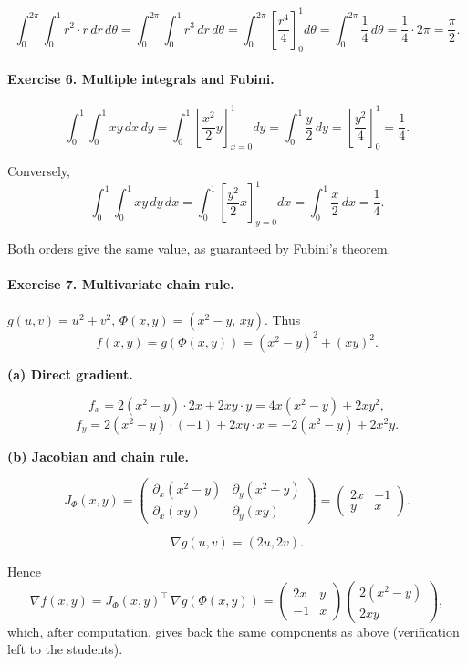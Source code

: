 \documentclass[11pt]{article}
\begin{document}
\[
\int_0^{2\pi}\int_0^1 r^2 \cdot r\,dr\,d\theta
= \int_0^{2\pi}\int_0^1 r^3\,dr\,d\theta
= \int_0^{2\pi}\left[\frac{r^4}{4}\right]_0^1 d\theta
= \int_0^{2\pi}\frac14\,d\theta
=\frac14\cdot 2\pi=\frac{\pi}{2}.
\]

\bigskip

\paragraph{Exercise 6. Multiple integrals and Fubini.}

\[
\int_0^1\int_0^1 xy\,dx\,dy
= \int_0^1\left[\frac{x^2}{2}y\right]_{x=0}^{1}dy
= \int_0^1 \frac{y}{2}\,dy
= \left[\frac{y^2}{4}\right]_0^1=\frac14.
\]

Conversely,
\[
\int_0^1\int_0^1 xy\,dy\,dx
= \int_0^1\left[\frac{y^2}{2}x\right]_{y=0}^{1}dx
= \int_0^1 \frac{x}{2}\,dx = \frac14.
\]

Both orders give the same value, as guaranteed by Fubini’s theorem.

\bigskip

\paragraph{Exercise 7. Multivariate chain rule.}

\(g(u,v)=u^2+v^2\), \(\Phi(x,y)=(x^2-y,\,xy)\).  
Thus
\[
f(x,y)=g(\Phi(x,y))=(x^2-y)^2+(xy)^2.
\]

\textbf{(a) Direct gradient.}

\[
f_x = 2(x^2-y)\cdot 2x + 2xy\cdot y = 4x(x^2-y)+2xy^2,
\]
\[
f_y = 2(x^2-y)\cdot(-1) + 2xy\cdot x = -2(x^2-y)+2x^2y.
\]

\textbf{(b) Jacobian and chain rule.}

\[
J_\Phi(x,y)=
\begin{pmatrix}
\partial_x(x^2-y) & \partial_y(x^2-y)\\[4pt]
\partial_x(xy) & \partial_y(xy)
\end{pmatrix}
=
\begin{pmatrix}
2x & -1\\[4pt]
y & x
\end{pmatrix}.
\]

\[
\nabla g(u,v)=(2u,2v).
\]

Hence
\[
\nabla f(x,y)=J_\Phi(x,y)^\top\,\nabla g(\Phi(x,y))
=
\begin{pmatrix}
2x & y\\[4pt]
-1 & x
\end{pmatrix}
\begin{pmatrix}
2(x^2-y)\\[4pt]
2xy
\end{pmatrix},
\]
which, after computation, gives back the same components as above (verification left to the students).
\end{document}
